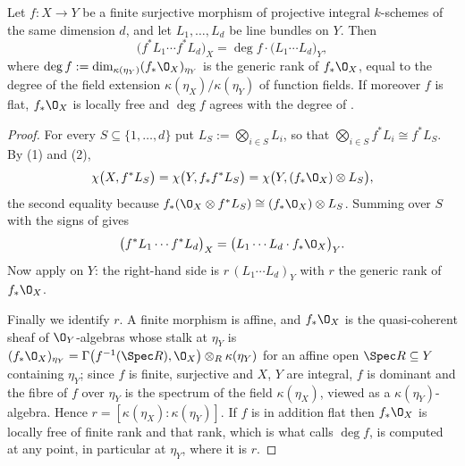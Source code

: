 \begin{proposition}
\label{prop:deg-projection-formula}
Let $f\colon X\to Y$ be a finite surjective morphism of projective integral
$k$-schemes of the same dimension $d$, and let $L_1,\dots,L_d$ be line bundles
on $Y$.  Then
\[
  \bigl(f^*L_1\cdots f^*L_d\bigr)_X=\deg f\cdot\bigl(L_1\cdots L_d\bigr)_Y,
\]
where $\deg f:=\dim_{\kappa(\eta_Y)}(f_*\O_X)_{\eta_Y}$ is the generic rank of
$f_*\O_X$, equal to the degree of the field extension
$\kappa(\eta_X)/\kappa(\eta_Y)$ of function fields.  If moreover $f$ is flat,
$f_*\O_X$ is locally free and $\deg f$ agrees with the degree of
.
\end{proposition}
\begin{proof}
For every $S\subseteq\{1,\dots,d\}$ put $L_S:=\bigotimes_{i\in S}L_i$, so that
$\bigotimes_{i\in S}f^*L_i\cong f^*L_S$.  By
(1) and (2),
\[
  \chi\bigl(X,f^*L_S\bigr)=\chi\bigl(Y,f_*f^*L_S\bigr)
  =\chi\bigl(Y,(f_*\O_X)\otimes L_S\bigr),
\]
the second equality because $f_*(\O_X\otimes f^*L_S)\cong(f_*\O_X)\otimes L_S$.
Summing over $S$ with the signs of  gives
\[
  \bigl(f^*L_1\cdots f^*L_d\bigr)_X
  =\bigl(L_1\cdots L_d\cdot f_*\O_X\bigr)_Y .
\]
Now apply  on $Y$: the right-hand side is
$r\,(L_1\cdots L_d)_Y$ with $r$ the generic rank of $f_*\O_X$.

Finally we identify $r$.  A finite morphism is affine, and $f_*\O_X$ is the
quasi-coherent sheaf of $\O_Y$-algebras whose stalk at $\eta_Y$ is
$(f_*\O_X)_{\eta_Y}=\Gamma\bigl(f^{-1}(\Spec R),\O_X\bigr)\otimes_R
\kappa(\eta_Y)$ for an affine open $\Spec R\subseteq Y$ containing $\eta_Y$;
since $f$ is finite, surjective and $X$, $Y$ are integral, $f$ is dominant and
the fibre of $f$ over $\eta_Y$ is the spectrum of the field
$\kappa(\eta_X)$, viewed as a $\kappa(\eta_Y)$-algebra.  Hence
$r=[\kappa(\eta_X):\kappa(\eta_Y)]$.  If $f$ is in addition flat then $f_*\O_X$
is locally free of finite rank and that rank, which is what
 calls $\deg f$, is computed at any point, in particular at
$\eta_Y$, where it is $r$.
\end{proof}

